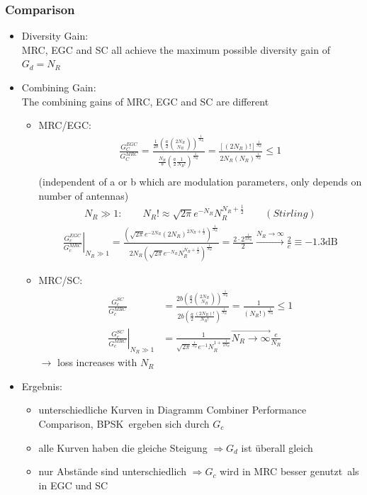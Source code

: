 \documentclass[a4paper, 10pt]{article}
\begin{document}
\subsubsection{Comparison}
	\begin{itemize}
		\item Diversity Gain:\\
			MRC, EGC and SC all achieve the maximum possible diversity gain of $G_d=N_R$
		\item Combining Gain:\\
			The combining gains of MRC, EGC and SC are different
			\begin{itemize}
			\item MRC/EGC:
			\begin{align*}
			\frac{G_C^{EGC}}{G_C^{MRC}}=\frac{\frac{1}{2b}\left(\frac{a}{2}\binom{2N_R}{N_R}\right)^{\frac{1}{N_R}}}{\frac{N_R}{b}\left(\frac{a}{2}\frac{1}{N_R!}\right)^{\frac{1}{N_R}}}
			=\frac{[(2N_R)!]^{\frac{1}{N_R}}}{2N_R(N_R)^{\frac{1}{N_R}}}\leq 1\\
			\end{align*}
			(independent of a or b which are modulation parameters, only depends on number of antennas)
			\begin{align*}
				N_R \gg 1: \qquad N_R!\approx \sqrt{2\pi}e^{-N_R}N_R^{N_R+\frac{1}{2}}\qquad(Stirling)
			\end{align*}
			\begin{align*}
				\left.\frac{G_c^{EGC}}{G_c^{MRC}}\right|_{N_R\gg1}
				=\frac{\left(\sqrt{2\pi}e^{-2N_R}(2N_R)^{2N_R+\frac{1}{2}}\right)^{\frac{1}{N_R}}}{2N_R\left(\sqrt{2\pi}e^{-N_R}N_R^{N_R+\frac{1}{2}}\right)^{\frac{1}{N_R}}}
				=\frac{2\cdot2^{\frac{1}{2N_R}}}{2}\overset{N_R\rightarrow\infty}{\rightarrow}\frac{2}{e}\equiv -1.3\mathrm{dB}
			\end{align*}
			\item MRC/SC:
			\begin{align*}
				\frac{G_c^{SC}}{G_c^{MRC}}
				&=\frac{2b\left(\frac{a}{2}\binom{2N_R}{N_R}\right)^{\frac{1}{N_R}}}{2b\left(\frac{a}{2}\frac{(2N_R)!}{N_R!}\right)^{\frac{1}{N_R}}}
				=\frac{1}{(N_R!)^{\frac{1}{N_R}}} \leq 1\\
				\left.\frac{G_c^{SC}}{G_c^{MRC}}\right|_{N_R\gg1}&=\frac{1}{\sqrt{2\pi}^{\frac{1}{N_R}}e^{-1}N_R^{1+\frac{1}{2N_R}}}\overset{\rightarrow}{N_R\rightarrow\infty}\frac{e}{N_R}
			\end{align*}
			$\rightarrow$ loss increases with $N_R$
			\end{itemize}
		\item Ergebnis:
		\begin{itemize}
			\item unterschiedliche Kurven in Diagramm \glqq Combiner Performance Comparison, BPSK\grqq\ ergeben sich durch $G_c$
			\item alle Kurven haben die gleiche Steigung $\Rightarrow G_d $ ist \"uberall gleich
			\item nur Abst\"ande sind unterschiedlich $\Rightarrow G_c $ wird in MRC besser \glqq genutzt\grqq\ als in EGC und SC
		\end{itemize}
	\end{itemize}
\end{document}
